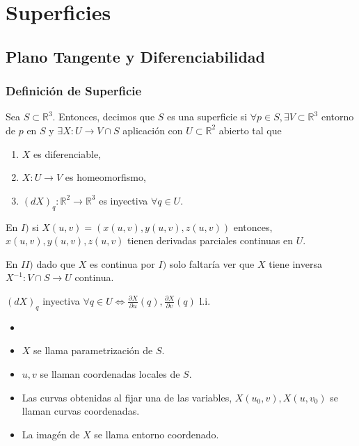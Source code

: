 \part{Superficies}
\chapter{Plano Tangente y Diferenciabilidad}

\section{Definición de Superficie}

\begin{defn}[Superficies]
  Sea $S \subset \mathbb{R}^{3}$. Entonces, decimos que $S$ es una superficie si $\forall p \in S, \exists V \subset \mathbb{R}^{3}$ entorno de $p$ en $S$ y $\exists X: U \to V \cap S$ aplicación con $U \subset \mathbb{R}^{2}$ abierto tal que
  \begin{enumerate}[label=(\roman*)]
    \item $X$ es diferenciable, 
    \item $X: U \to V$ es homeomorfismo,
    \item $(dX)_{q} : \mathbb{R}^{2} \to \mathbb{R}^{3}$ es inyectiva $ \forall q \in U$.
  \end{enumerate}
\end{defn}

\begin{obs}
  En $I)$ si $X(u, v) = (x(u, v), y(u, v), z(u, v))$ entonces, $x(u, v), y(u, v), z(u, v)$ tienen derivadas parciales continuas en $U$.
\end{obs}

\begin{obs}
  En $II)$ dado que $X$ es continua por $I)$ solo faltaría ver que $X$ tiene inversa $X^{-1}: V \cap S \to U$ continua.
\end{obs}


\begin{obs}
  $(dX)_{q}$ inyectiva $\forall q \in U \Leftrightarrow \frac{\partial{X}}{\partial{u}}(q), \frac{\partial{X}}{\partial{v}}(q)$ l.i.
\end{obs}

\begin{nota}
  \begin{itemize}
    \item []
    \item $X$ se llama parametrización de $S$.
    \item $u, v$ se llaman coordenadas locales de $S$.
    \item Las curvas obtenidas al fijar una de las variables, $X(u_{0}, v), X(u, v_{0})$ se llaman curvas coordenadas.
    \item La imagén de $X$ se llama entorno coordenado.
  \end{itemize}
\end{nota} 

